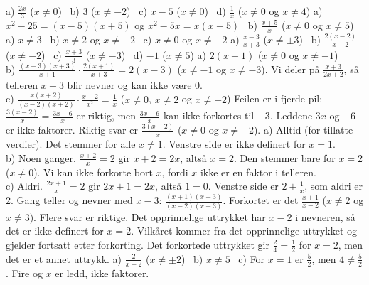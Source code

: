 
 a) $\frac{2x}{3}$ ($x \neq 0$) \ b) $3$ ($x \neq -2$) \ c) $x-5$ ($x \neq 0$) \ d) $\frac{1}{x}$ ($x \neq 0$ og $x \neq 4$)
 a) $x^2-25 = (x-5)(x+5)$ og $x^2-5x = x(x-5)$ \ b) $\frac{x+5}{x}$ ($x \neq 0$ og $x \neq 5$)
 a) $x \neq 3$ \ b) $x \neq 2$ og $x \neq -2$ \ c) $x \neq 0$ og $x \neq -2$
 a) $\frac{x-3}{x+3}$ ($x \neq \pm 3$) \ b) $\frac{2(x-2)}{x+2}$ ($x \neq -2$) \ c) $\frac{x+3}{3}$ ($x \neq -3$) \ d) $-1$ ($x \neq 5$)
 a) $2(x-1)$ ($x \neq 0$ og $x \neq -1$)\\
b) $\frac{(x-3)(x+3)}{x+1}\cdot\frac{2(x+1)}{x+3} = 2(x-3)$ ($x \neq -1$ og $x \neq -3$).
Vi deler på $\frac{x+3}{2x+2}$, så telleren $x+3$ blir nevner og kan ikke være 0.\\
c) $\frac{x(x+2)}{(x-2)(x+2)}\cdot\frac{x-2}{x^2} = \frac{1}{x}$ ($x \neq 0$, $x \neq 2$ og $x \neq -2$)
 Feilen er i fjerde pil: $\frac{3(x-2)}{x} = \frac{3x-6}{x}$ er riktig, men $\frac{3x-6}{x}$ kan ikke forkortes til $-3$. Leddene $3x$ og $-6$ er ikke faktorer.
Riktig svar er $\frac{3(x-2)}{x}$ ($x \neq 0$ og $x \neq -2$).
 a) Alltid (for tillatte verdier). Det stemmer for alle $x \neq 1$. Venstre side er ikke definert for $x = 1$.\\
b) Noen ganger. $\frac{x+2}{x} = 2$ gir $x + 2 = 2x$, altså $x = 2$. Den stemmer bare for $x = 2$ ($x \neq 0$). Vi kan ikke forkorte bort $x$, fordi $x$ ikke er en faktor i telleren.\\
c) Aldri. $\frac{2x+1}{x} = 2$ gir $2x+1 = 2x$, altså $1 = 0$. Venstre side er $2+\frac{1}{x}$, som aldri er 2.
 Gang teller og nevner med $x-3$: $\frac{(x+1)(x-3)}{(x-2)(x-3)}$. Forkortet er det $\frac{x+1}{x-2}$ ($x \neq 2$ og $x \neq 3$). Flere svar er riktige.
 Det opprinnelige uttrykket har $x-2$ i nevneren, så det er ikke definert for $x = 2$.
Vilkåret kommer fra det opprinnelige uttrykket og gjelder fortsatt etter forkorting.
Det forkortede uttrykket gir $\frac{2}{4} = \frac{1}{2}$ for $x = 2$, men det er et annet uttrykk.
 a) $\frac{2}{x-2}$ ($x \neq \pm 2$) \ b) $x \neq 5$ \ c) For $x = 1$ er $\frac{5}{2}$, men $4 \neq \frac{5}{2}$. Fire og $x$ er ledd, ikke faktorer.

